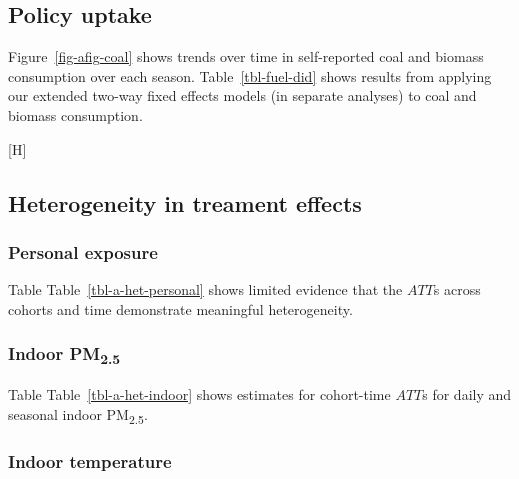 \documentclass[
  letterpaper,
  DIV=11,
  numbers=noendperiod]{scrartcl}
\makeatletter
\renewenvironment{figure}%
   {\renewcommand\familydefault\sfdefault
    \@float{figure}}
   {\end@float}
\makeatother
\begin{document}
\newpage

\newpage

\subsection{Policy uptake}\label{policy-uptake-1}

Figure~\ref{fig-afig-coal} shows trends over time in self-reported coal
and biomass consumption over each season. Table~\ref{tbl-fuel-did} shows
results from applying our extended two-way fixed effects models (in
separate analyses) to coal and biomass consumption.

\begin{figure}[H]


\caption{\label{fig-afig-coal}Trends in self-reported coal and biomass,
by treatment season}

\end{figure}%

\newpage

\subsection{Heterogeneity in treament
effects}\label{heterogeneity-in-treament-effects}

\subsubsection{Personal exposure}\label{personal-exposure}

Table Table~\ref{tbl-a-het-personal} shows limited evidence that the
\(ATT\)s across cohorts and time demonstrate meaningful heterogeneity.

\subsubsection{\texorpdfstring{Indoor
PM\textsubscript{2.5}}{Indoor PM2.5}}\label{indoor-pm2.5-1}

Table Table~\ref{tbl-a-het-indoor} shows estimates for cohort-time
\(ATT\)s for daily and seasonal indoor PM\textsubscript{2.5}.

\newpage

\subsubsection{Indoor temperature}\label{indoor-temperature}
\end{document}
